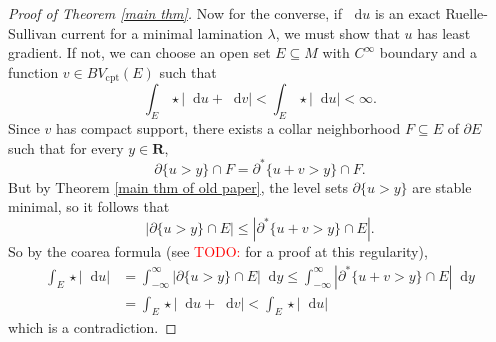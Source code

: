 \documentclass[reqno,11pt]{amsart}
\newcommand{\RR}{\mathbf{R}}
\newcommand*\dif{\mathop{}\!\mathrm{d}}
\newcommand{\cpt}{\mathrm{cpt}}
\theoremstyle{definition}
\numberwithin{equation}{section}
\newcommand\todo[1]{\textcolor{red}{TODO: #1}}
\begin{document}
\begin{proof}[Proof of Theorem \ref{main thm}]
Now for the converse, if $\dif u$ is an exact Ruelle-Sullivan current for a minimal lamination $\lambda$, we must show that $u$ has least gradient.
If not, we can choose an open set $E \subseteq M$ with $C^\infty$ boundary and a function $v \in BV_\cpt(E)$ such that
$$\int_E \star |\dif u + \dif v| < \int_E \star |\dif u| < \infty.$$
Since $v$ has compact support, there exists a collar neighborhood $F \subseteq E$ of $\partial E$ such that for every $y \in \RR$,
$$\partial \{u > y\} \cap F = \partial^* \{u + v > y\} \cap F.$$
But by Theorem \ref{main thm of old paper}, the level sets $\partial \{u > y\}$ are stable minimal, so it follows that
$$|\partial \{u > y\} \cap E| \leq |\partial^* \{u + v > y\} \cap E|.$$
So by the coarea formula (see \todo{\cite{BackusFLG}}  for a proof at this regularity),
\begin{align*}
\int_E \star |\dif u| &= \int_{-\infty}^\infty |\partial \{u > y\} \cap E| \dif y \leq \int_{-\infty}^\infty |\partial^* \{u + v > y\} \cap E| \dif y \\
&= \int_E \star |\dif u + \dif v| < \int_E \star |\dif u|
\end{align*}
which is a contradiction.
\end{proof}


\printbibliography
\end{document}
